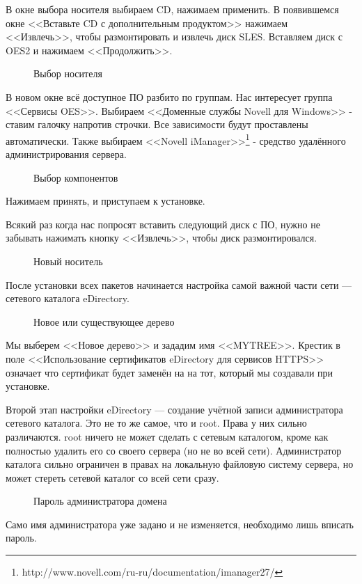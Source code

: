 В окне выбора носителя выбираем CD, нажимаем применить. В появившемся окне <<Вставьте CD с дополнительным продуктом>> нажимаем <<Извлечь>>, чтобы размонтировать и извлечь диск SLES. Вставляем диск с OES2 и нажимаем <<Продолжить>>.
\begin{figure}[H]
\caption{Выбор носителя}
\end{figure}
\clearpage

В новом окне всё доступное ПО разбито по группам. Нас интересует группа <<Сервисы OES>>. Выбираем <<Доменные службы Novell для Windows>> - ставим галочку напротив строчки. Все зависимости будут проставлены автоматически. Также выбираем <<Novell iManager>>\footnote{http://www.novell.com/ru-ru/documentation/imanager27/} - средство удалённого администрирования сервера.
\begin{figure}[H]
\caption{Выбор компонентов}
\end{figure}
Нажимаем принять, и приступаем к установке.
\clearpage

Всякий раз когда нас попросят вставить следующий диск с ПО, нужно не забывать нажимать кнопку <<Извлечь>>, чтобы диск размонтировался.
\begin{figure}[H]
\caption{Новый носитель}
\end{figure}
\clearpage

После установки всех пакетов начинается настройка самой важной части сети --- сетевого каталога eDirectory.
\begin{figure}[H]
\caption{Новое или существующее дерево}
\end{figure}
Мы выберем <<Новое дерево>> и зададим имя <<MYTREE>>. Крестик в поле <<Использование сертификатов eDirectory для сервисов HTTPS>> означает что сертификат будет заменён на на тот, который мы создавали при установке.
\clearpage

\label{sec:eDirpass}
Второй этап настройки eDirectory --- создание учётной записи администратора сетевого каталога. Это не то же самое, что и root. Права у них сильно различаются. root ничего не может сделать с сетевым каталогом, кроме как полностью удалить его со своего сервера (но не во всей сети). Администратор каталога сильно ограничен в правах на локальную файловую систему сервера, но может стереть сетевой каталог со всей сети сразу.
\begin{figure}[H]
\caption{Пароль администратора домена}
\end{figure}
Само имя администратора уже задано и не изменяется, необходимо лишь вписать пароль.
\clearpage

